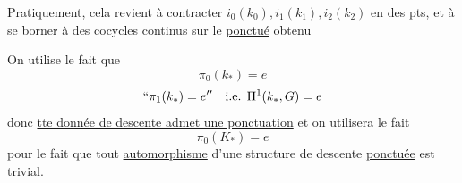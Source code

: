 Pratiquement, cela revient à contracter $i_0(k_0),i_1(k_1),i_2(k_2)$
en des pts, et à se borner à des cocycles continus sur le
\uline{ponctué} obtenu

On utilise le fait que
\[
\pi_0(k_*)=e
\]
\[
``\pi_1(k_*)=e''\quad\text{i.e. }\Pi^1(k_*,G)=e
\]
donc \uline{tte donnée de descente admet une ponctuation}
et on utilisera le fait
\[
\pi_0(K_*)=e
\]
pour le fait que 
tout \uline{automorphisme} d'une structure de descente
\uline{ponctuée} est trivial.

